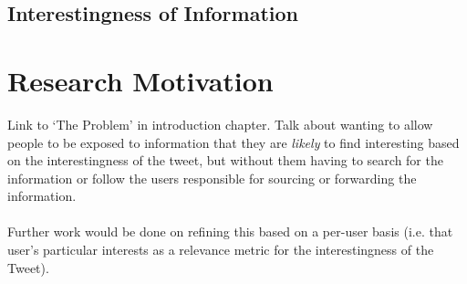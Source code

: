 \subsection{Interestingness of Information}

\section{Research Motivation}
Link to `The Problem' in introduction chapter. Talk about wanting to allow people to be exposed to information that they are \textit{likely} to find interesting based on the interestingness of the tweet, but without them having to search for the information or follow the users responsible for sourcing or forwarding the information. \\ \\
Further work would be done on refining this based on a per-user basis (i.e. that user's particular interests as a relevance metric for the interestingness of the Tweet).